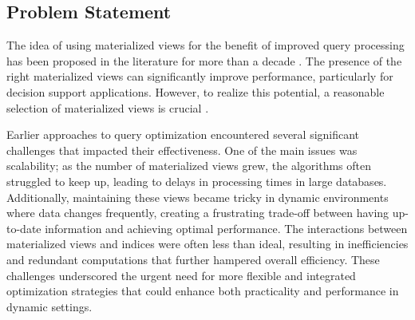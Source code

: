 \subsection{Problem Statement}
The idea of using materialized views for the benefit of improved query processing has been proposed in the literature for more than a decade \cite{Blakeley1986EfficientlyUM}. The presence of the right materialized views can significantly improve performance, particularly for decision support applications. However, to realize this potential, a reasonable selection of materialized views is crucial \cite{agrawal2000automated}.

Earlier approaches to query optimization encountered several significant challenges that impacted their effectiveness. One of the main issues was scalability; as the number of materialized views grew, the algorithms often struggled to keep up, leading to delays in processing times in large databases. Additionally, maintaining these views became tricky in dynamic environments where data changes frequently, creating a frustrating trade-off between having up-to-date information and achieving optimal performance. The interactions between materialized views and indices were often less than ideal, resulting in inefficiencies and redundant computations that further hampered overall efficiency. These challenges underscored the urgent need for more flexible and integrated optimization strategies that could enhance both practicality and performance in dynamic settings.

